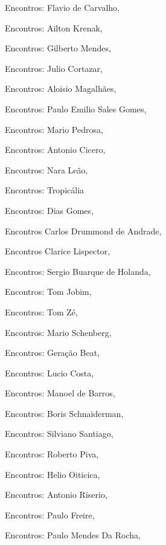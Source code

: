 \begin{multicols}{2}
\begin{enumerate}
{\item Encontros: Flavio de Carvalho, {}
\item Encontros: Ailton Krenak, {}
\item Encontros: Gilberto Mendes, {}
\item Encontros: Julio Cortazar, {}
\item Encontros: Aloisio Magalhães, {}
\item Encontros: Paulo Emilio Sales Gomes, {}
\item Encontros: Mario Pedrosa, {}
\item Encontros: Antonio Cicero, {}
\item Encontros: Nara Leão, {}
\item Encontros: Tropicália
\item Encontros: Dias Gomes, {}
\item Encontros Carlos Drummond de Andrade, {}
\item Encontros Clarice Lispector, {}
\item Encontros: Sergio Buarque de Holanda, {}
\item Encontros: Tom Jobim, {}
\item Encontros: Tom Zé, {}
\item Encontros: Mario Schenberg, {}
\item Encontros: Geração Beat, {}
\item Encontros: Lucio Costa, {}
\item Encontros: Manoel de Barros, {}
\item Encontros: Boris Schnaiderman, {}
\item Encontros: Silviano Santiago, {}
\item Encontros: Roberto Piva, {}
\item Encontros: Helio Oiticica, {}
\item Encontros: Antonio Riserio, {}
\item Encontros: Paulo Freire, {}
\item Encontros: Paulo Mendes Da Rocha, {}
}
\end{enumerate}
\end{multicols}

\pagebreak

